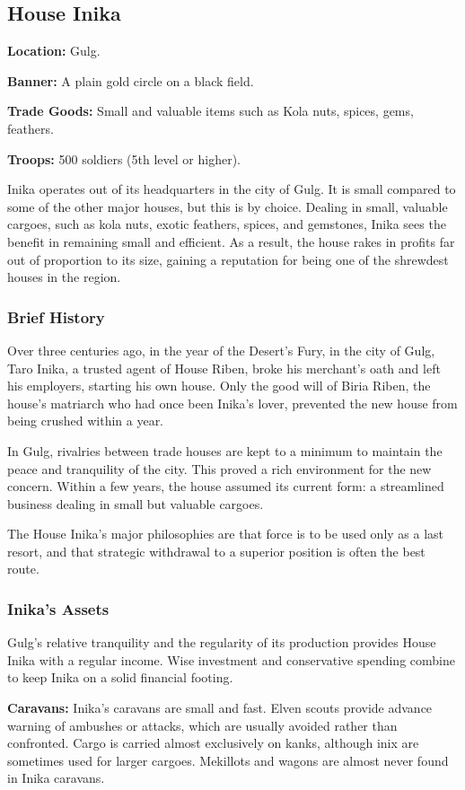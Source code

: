 \subsection{House Inika}
\textbf{Location:} Gulg.

\textbf{Banner:} A plain gold circle on a black field.

\textbf{Trade Goods:} Small and valuable items such as Kola nuts, spices, gems, feathers.

\textbf{Troops:} 500 soldiers (5th level or higher).

Inika operates out of its headquarters in the city of Gulg. It is small compared to some of the other major houses, but this is by choice. Dealing in small, valuable cargoes, such as kola nuts, exotic feathers, spices, and gemstones, Inika sees the benefit in remaining small and efficient. As a result, the house rakes in profits far out of proportion to its size, gaining a reputation for being one of the shrewdest houses in the region.

\subsubsection{Brief History}
Over three centuries ago, in the year of the Desert's Fury, in the city of Gulg, Taro Inika, a trusted agent of House Riben, broke his merchant's oath and left his employers, starting his own house. Only the good will of Biria Riben, the house's matriarch who had once been Inika's lover, prevented the new house from being crushed within a year.

In Gulg, rivalries between trade houses are kept to a minimum to maintain the peace and tranquility of the city. This proved a rich environment for the new concern. Within a few years, the house assumed its current form: a streamlined business dealing in small but valuable cargoes.

The House Inika's major philosophies are that force is to be used only as a last resort, and that strategic withdrawal to a superior position is often the best route.

\subsubsection{Inika's Assets}
Gulg's relative tranquility and the regularity of its production provides House Inika with a regular income. Wise investment and conservative spending combine to keep Inika on a solid financial footing.

\textbf{Caravans:} Inika's caravans are small and fast. Elven scouts provide advance warning of ambushes or attacks, which are usually avoided rather than confronted. Cargo is carried almost exclusively on kanks, although inix are sometimes used for larger cargoes. Mekillots and wagons are almost never found in Inika caravans.

